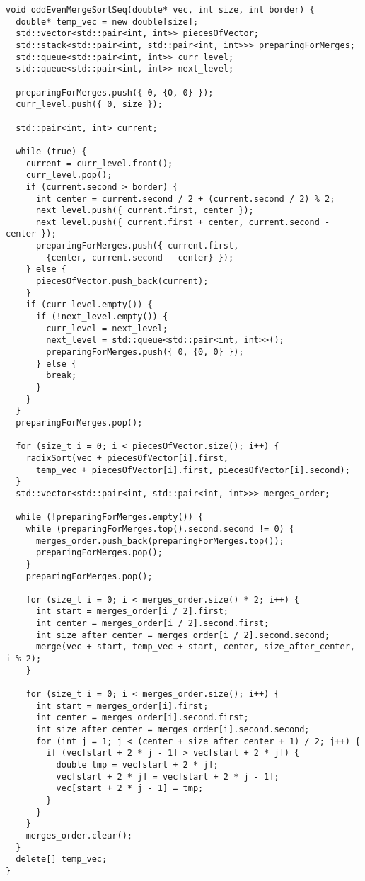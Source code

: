 \documentclass{report}
\begin{document}
\begin{lstlisting}
void oddEvenMergeSortSeq(double* vec, int size, int border) {
  double* temp_vec = new double[size];
  std::vector<std::pair<int, int>> piecesOfVector;
  std::stack<std::pair<int, std::pair<int, int>>> preparingForMerges;
  std::queue<std::pair<int, int>> curr_level;
  std::queue<std::pair<int, int>> next_level;

  preparingForMerges.push({ 0, {0, 0} });
  curr_level.push({ 0, size });

  std::pair<int, int> current;

  while (true) {
    current = curr_level.front();
    curr_level.pop();
    if (current.second > border) {
      int center = current.second / 2 + (current.second / 2) % 2;
      next_level.push({ current.first, center });
      next_level.push({ current.first + center, current.second - center });
      preparingForMerges.push({ current.first,
        {center, current.second - center} });
    } else {
      piecesOfVector.push_back(current);
    }
    if (curr_level.empty()) {
      if (!next_level.empty()) {
        curr_level = next_level;
        next_level = std::queue<std::pair<int, int>>();
        preparingForMerges.push({ 0, {0, 0} });
      } else {
        break;
      }
    }
  }
  preparingForMerges.pop();

  for (size_t i = 0; i < piecesOfVector.size(); i++) {
    radixSort(vec + piecesOfVector[i].first,
      temp_vec + piecesOfVector[i].first, piecesOfVector[i].second);
  }
  std::vector<std::pair<int, std::pair<int, int>>> merges_order;

  while (!preparingForMerges.empty()) {
    while (preparingForMerges.top().second.second != 0) {
      merges_order.push_back(preparingForMerges.top());
      preparingForMerges.pop();
    }
    preparingForMerges.pop();

    for (size_t i = 0; i < merges_order.size() * 2; i++) {
      int start = merges_order[i / 2].first;
      int center = merges_order[i / 2].second.first;
      int size_after_center = merges_order[i / 2].second.second;
      merge(vec + start, temp_vec + start, center, size_after_center, i % 2);
    }

    for (size_t i = 0; i < merges_order.size(); i++) {
      int start = merges_order[i].first;
      int center = merges_order[i].second.first;
      int size_after_center = merges_order[i].second.second;
      for (int j = 1; j < (center + size_after_center + 1) / 2; j++) {
        if (vec[start + 2 * j - 1] > vec[start + 2 * j]) {
          double tmp = vec[start + 2 * j];
          vec[start + 2 * j] = vec[start + 2 * j - 1];
          vec[start + 2 * j - 1] = tmp;
        }
      }
    }
    merges_order.clear();
  }
  delete[] temp_vec;
}


\end{lstlisting}
\end{document}
